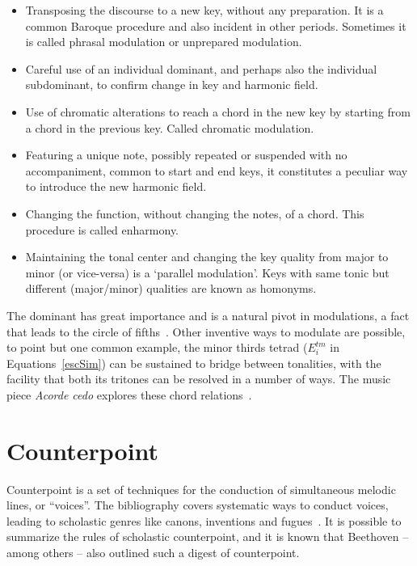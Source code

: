 \documentclass[format=acmsmall, review=false, screen=true]{acmart}
\begin{document}
\begin{itemize}
    \item Transposing the discourse to a new key, without any preparation. It is a common Baroque procedure and also incident in other periods. Sometimes it is 
    called phrasal modulation or unprepared modulation.
    \item Careful use of an individual dominant, and perhaps also the individual
    subdominant, to confirm change in key and harmonic field.
    \item Use of chromatic alterations to reach a chord in the new key by starting from a chord in the previous key. Called chromatic modulation.
    \item Featuring a unique note, possibly repeated or suspended with no accompaniment, common to start and end keys, it constitutes a peculiar way
    to introduce the new harmonic field.
    \item Changing the function, without changing the notes, of a chord.
        This procedure is called enharmony.
    \item Maintaining the tonal center and changing the key quality from major to minor
    (or vice-versa) is a `parallel modulation'. Keys with same tonic but
		different (major/minor) qualities are known as homonyms.
\end{itemize}

The dominant has great importance and is a natural pivot in modulations,
a fact that leads to the circle of fifths~\cite{Harmonia,Salzer,Koellheuteur,Harmony}.
Other inventive ways to modulate are possible, to point but one common example, the minor thirds tetrad ($E_i^{tm}$ in Equations~\ref{escSim}) can be sustained to bridge between tonalities, with the facility that both its tritones can be resolved in a number of ways.
The music piece \emph{Acorde cedo} explores these chord relations~\cite{MASSA}.

\section{Counterpoint}\label{subsec:contraponto}
Counterpoint is a set of techniques for the conduction of simultaneous melodic lines, or ``voices''.
The bibliography covers systematic ways to conduct voices, leading to scholastic genres like canons, inventions and fugues~\cite{Fux,SchoenbergContra}. It is possible to
summarize the rules of scholastic counterpoint, and it is known that Beethoven --
among others -- also outlined such a digest of counterpoint.
\end{document}
